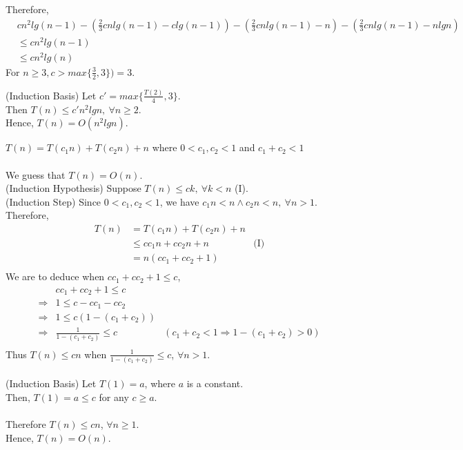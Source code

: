 \documentclass[12pt]{article}
\newenvironment{lemma}[2][Lemma]{\begin{trivlist}
\item[\hskip \labelsep {\bfseries #1}\hskip \labelsep {\bfseries #2.}]}{\end{trivlist}}
\newenvironment{question}[2][Question]{\begin{trivlist}
\item[\hskip \labelsep {\bfseries #1}\hskip \labelsep {\bfseries #2.}]}{\end{trivlist}}
\begin{document}
\begin{question}{1 (b)}
\begin{lemma}{1.6}
    Therefore,
    \begin{align*}
      & cn^{2}lg(n-1) - (\frac{2}{3}cnlg(n-1) - clg(n-1)) - (\frac{2}{3}cnlg(n-1) - n) - (\frac{2}{3}cnlg(n-1) - nlgn) &\\
      & \leq cn^{2}lg(n-1) & \\
      & \leq cn^{2}lg(n) &
    \end{align*}
    For $n \geq 3, c > max\{\frac{3}{2}, 3\}) = 3$.

    (Induction Basis) Let $c' = max\{\frac{T(2)}{4}, 3\}$.\\
    Then $T(n) \leq c'n^{2}lgn,\ \forall n \geq 2$. \\
    Hence, $T(n) = O(n^{2}lgn)$.
  \end{lemma}
\end{question}

\begin{question}{2} $T(n) = T(c_{1}n) + T(c_{2}n) + n$ where $ 0 < c_{1}, c_{2} < 1$ and $c_{1} + c_{2} < 1$
  \leavevmode \\ \\
  We guess that $T(n) = O(n)$. \\
  (Induction Hypothesis) Suppose $T(n) \leq ck,\ \forall k < n$ (I). \\
  (Induction Step) Since $0 < c_{1}, c_{2} < 1$, we have $c_{1}n < n \land c_{2}n < n,\ \forall n > 1$.
  Therefore,
  \begin{align*}
    T(n) & = T(c_{1}n) + T(c_{2}n) + n & \\
         & \leq cc_{1}n + cc_{2}n + n & \text{(I)} \\
         & = n(cc_{1} + cc_{2} + 1) & \\
  \end{align*}
  We are to deduce when $cc_{1} + cc_{2} + 1 \leq c$,
  \begin{align*}
    & cc_{1} + cc_{2} + 1 \leq c & \\
    \Rightarrow & 1 \leq c - cc_{1} - cc_{2} &\\
    \Rightarrow & 1 \leq c(1 - (c_{1} + c_{2})) &\\
    \Rightarrow & \frac{1}{1 - (c_{1} + c_{2})} \leq c & (c_{1} + c_{2} < 1\Rightarrow 1 - (c_{1} + c_{2}) > 0)\\
  \end{align*}
  Thus $T(n) \leq cn$ when $\frac{1}{1 - (c_{1} + c_{2})} \leq c$, $\forall n > 1$. \\ \\
  (Induction Basis) Let $T(1) = a$, where $a$ is a constant.\\
  Then, $T(1) = a \leq c$ for any $c \geq a$. \\ \\
  Therefore $T(n) \leq cn$, $\forall n \geq 1$.\\
  Hence, $T(n) = O(n)$.
\end{question}
\end{document}
